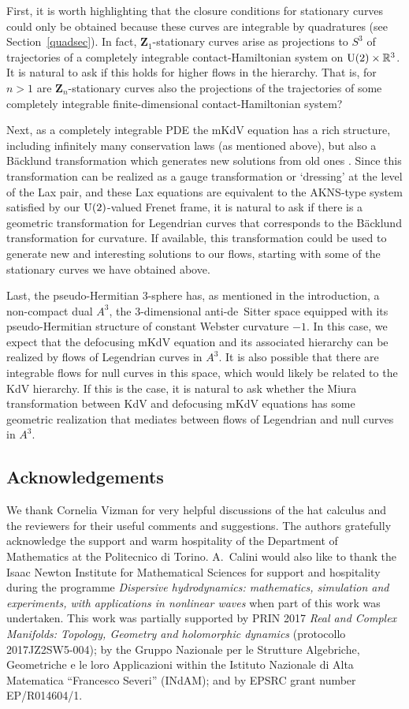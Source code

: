 \documentclass[10pt,a4paper]{amsart}
\newcommand\VZ{\mathbf Z}
\def\R{\mathbb R}
\numberwithin{equation}{section}
\begin{document}
First, it is worth highlighting that the closure conditions for stationary curves could
only be obtained because these curves are integrable by quadratures (see Section~\ref{quadsec}). In fact, $\VZ_1$-stationary curves arise as projections to $S^3$ of trajectories of a completely integrable contact-Hamiltonian system on ${\rm U}(2)\times \R^3$.
It is natural to ask if this holds for higher flows in the hierarchy. That is, for $n>1$
are $\VZ_n$-stationary curves also the projections of the trajectories of some completely integrable finite-dimensional contact-Hamiltonian system?

Next, as a completely integrable PDE the mKdV equation has a rich structure, including infinitely many conservation laws (as mentioned above), but also a B\"acklund transformation which generates new solutions from old ones \cite{KW,Wa}. Since this transformation can be realized as a gauge transformation or `dressing' at the level of the Lax pair, and these Lax equations are equivalent to the
AKNS-type system satisfied by our ${\rm U}(2)$-valued Frenet frame, it is natural to ask if
there is a geometric transformation for Legendrian curves that corresponds to the
B\"acklund transformation for curvature. If available, this transformation could be
used to generate new and interesting solutions to our flows, starting with some of the stationary curves we have obtained above.

Last, the pseudo-Hermitian 3-sphere has, as mentioned in the introduction, a non-compact dual $A^3$, the 3-dimensional
anti-de~Sitter space equipped with its pseudo-Hermitian structure of constant Webster curvature $-1$. In this case, we expect that the defocusing mKdV equation and its associated hierarchy can be realized by flows of Legendrian curves in $A^3$. It is also possible that there are integrable flows for null curves in this space, which would likely be related to the KdV hierarchy. If this is the case, it is natural to ask whether the Miura transformation \cite{Mi} between KdV and defocusing mKdV equations has some geometric realization that mediates between flows of Legendrian and null curves in $A^3$.

\subsection*{Acknowledgements}
We thank Cornelia Vizman for very helpful discussions of the hat calculus and the reviewers for their useful comments and suggestions. The authors gratefully acknowledge the support and warm hospitality of the Department of Mathematics at the Politecnico di Torino.
A.~Calini would also like to thank the Isaac Newton Institute for Mathematical Sciences for support and hospitality during the programme {\em Dispersive hydrodynamics: mathematics, simulation and experiments, with applications in nonlinear waves} when part of this work was undertaken.
This work was partially supported by PRIN 2017 {\em Real and Complex Manifolds: Topology, Geometry and holomorphic dynamics} (protocollo 2017JZ2SW5-004);
by the Gruppo Nazionale per le Strutture Algebriche, Geometriche e le loro Applicazioni within the Istituto Nazionale di Alta Matematica ``Francesco Severi'' (INdAM); and by EPSRC grant number EP/R014604/1.
\end{document}
